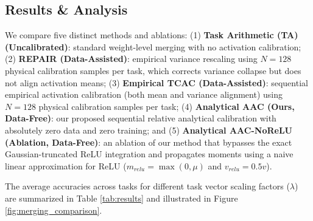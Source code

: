 \documentclass{article}
\theoremstyle{plain}
\theoremstyle{definition}
\theoremstyle{remark}
\begin{document}
\subsection{Results \& Analysis}
We compare five distinct methods and ablations: (1) \textbf{Task Arithmetic (TA) (Uncalibrated)}: standard weight-level merging with no activation calibration; (2) \textbf{REPAIR (Data-Assisted)}: empirical variance rescaling \cite{jordan2022repair} using $N=128$ physical calibration samples per task, which corrects variance collapse but does not align activation means; (3) \textbf{Empirical TCAC (Data-Assisted)}: sequential empirical activation calibration (both mean and variance alignment) using $N=128$ physical calibration samples per task; (4) \textbf{Analytical AAC (Ours, Data-Free)}: our proposed sequential relative analytical calibration with absolutely zero data and zero training; and (5) \textbf{Analytical AAC-NoReLU (Ablation, Data-Free)}: an ablation of our method that bypasses the exact Gaussian-truncated ReLU integration and propagates moments using a naive linear approximation for ReLU ($m_{relu} = \max(0, \mu)$ and $v_{relu} = 0.5 v$).

The average accuracies across tasks for different task vector scaling factors ($\lambda$) are summarized in Table \ref{tab:results} and illustrated in Figure \ref{fig:merging_comparison}.
\end{document}
